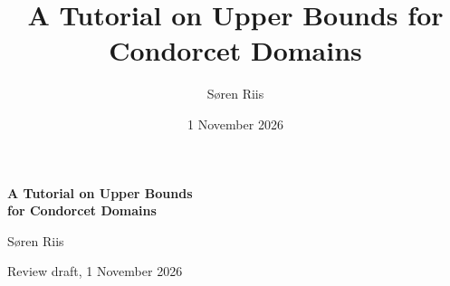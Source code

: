 \documentclass[11pt,letterpaper]{article}
\title{A Tutorial on Upper Bounds for Condorcet Domains}
\author{S\o ren Riis}
\date{1 November 2026}
\numberwithin{equation}{section}
\theoremstyle{definition}
\begin{document}
\begin{center}
{\LARGE\bfseries A Tutorial on Upper Bounds\\[2pt]
for Condorcet Domains}\par
\medskip
{\large S\o ren Riis}\par
\small Review draft, 1 November 2026
\end{center}

\clearpage
\setcounter{tocdepth}{1}
{\small\setlength{\parskip}{0pt}\tableofcontents}
\clearpage

\clearpage











\appendix


\end{document}

